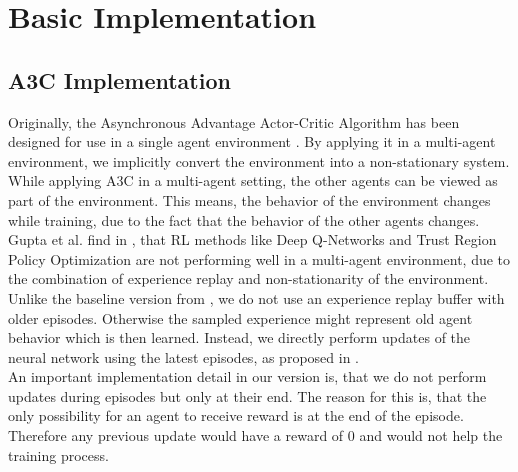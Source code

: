 

%
%

\chapter{Basic Implementation}\label{chap.basic_implementation}
\section{A3C Implementation}\label{a3c_implementation}
Originally, the Asynchronous Advantage Actor-Critic Algorithm has been designed for use in a single agent environment \cite{a3c}.
By applying it in a multi-agent environment, we implicitly convert the environment into a non-stationary system.
While applying A3C in a multi-agent setting, the other agents can be viewed as part of the environment. This means, the behavior of the environment changes while training, due to the fact that the behavior of the other agents changes.
Gupta et al. find in \cite{multiagent_comp_a3c_dqn_etc}, that RL methods like Deep Q-Networks and Trust Region Policy Optimization are not performing well in a multi-agent environment, due to the combination of experience replay and non-stationarity of the environment. Unlike the baseline version from \cite{flatlandstephan}, we do not use an experience replay buffer with older episodes. Otherwise the sampled experience might represent old agent behavior which is then learned. Instead, we directly perform updates of the neural network using the latest episodes, as proposed in \cite{a3c}.\\
An important implementation detail in our version is, that we do not perform updates during episodes but only at their end. The reason for this is, that the only possibility for an agent to receive reward is at the end of the episode. Therefore any previous update would have a reward of 0 and would not help the training process.

